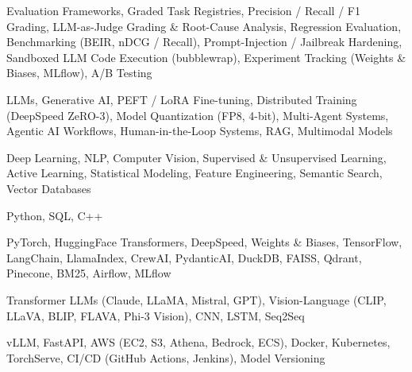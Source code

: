\documentclass[letter,10pt]{article}
\begin{document}
 Evaluation Frameworks, Graded Task Registries, Precision / Recall / F1 Grading, LLM-as-Judge Grading \& Root-Cause Analysis, Regression Evaluation, Benchmarking (BEIR, nDCG / Recall), Prompt-Injection / Jailbreak Hardening, Sandboxed LLM Code Execution (bubblewrap), Experiment Tracking (Weights \& Biases, MLflow), A/B Testing\par\vspace{2pt}

 LLMs, Generative AI, PEFT / LoRA Fine-tuning, Distributed Training (DeepSpeed ZeRO-3), Model Quantization (FP8, 4-bit), Multi-Agent Systems, Agentic AI Workflows, Human-in-the-Loop Systems, RAG, Multimodal Models\par\vspace{2pt}

 Deep Learning, NLP, Computer Vision, Supervised \& Unsupervised Learning, Active Learning, Statistical Modeling, Feature Engineering, Semantic Search, Vector Databases\par\vspace{2pt}

 Python, SQL, C++\par\vspace{2pt}

 PyTorch, HuggingFace Transformers, DeepSpeed, Weights \& Biases, TensorFlow, LangChain, LlamaIndex, CrewAI, PydanticAI, DuckDB, FAISS, Qdrant, Pinecone, BM25, Airflow, MLflow\par\vspace{2pt}

 Transformer LLMs (Claude, LLaMA, Mistral, GPT), Vision-Language (CLIP, LLaVA, BLIP, FLAVA, Phi-3 Vision), CNN, LSTM, Seq2Seq\par\vspace{2pt}

 vLLM, FastAPI, AWS (EC2, S3, Athena, Bedrock, ECS), Docker, Kubernetes, TorchServe, CI/CD (GitHub Actions, Jenkins), Model Versioning
\end{document}

